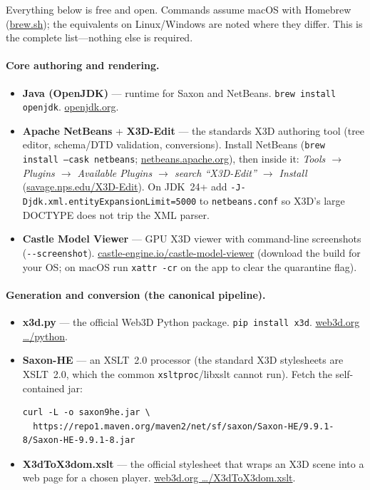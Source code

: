 \documentclass[11pt]{article}
\begin{document}
Everything below is free and open. Commands assume macOS with Homebrew
(\href{https://brew.sh}{brew.sh}); the equivalents on Linux/Windows are
noted where they differ. This is the complete list---nothing else is required.

\paragraph{Core authoring and rendering.}
\begin{itemize}[leftmargin=1.4em, itemsep=2pt]
\item \textbf{Java (OpenJDK)} --- runtime for Saxon and NetBeans.
  \texttt{brew install openjdk}. \href{https://openjdk.org}{openjdk.org}.
\item \textbf{Apache NetBeans} + \textbf{X3D-Edit} --- the standards X3D authoring
  tool (tree editor, schema/DTD validation, conversions). Install NetBeans
  (\texttt{brew install --cask netbeans}; \href{https://netbeans.apache.org}{netbeans.apache.org}),
  then inside it: \emph{Tools $\to$ Plugins $\to$ Available Plugins $\to$ search
  ``X3D-Edit'' $\to$ Install}
  (\href{https://savage.nps.edu/X3D-Edit/}{savage.nps.edu/X3D-Edit}). On JDK~24+
  add \texttt{-J-Djdk.xml.entityExpansionLimit=5000} to \texttt{netbeans.conf}
  so X3D's large DOCTYPE does not trip the XML parser.
\item \textbf{Castle Model Viewer} --- GPU X3D viewer with command-line
  screenshots (\texttt{-{}-screenshot}).
  \href{https://castle-engine.io/castle-model-viewer}{castle-engine.io/castle-model-viewer}
  (download the build for your OS; on macOS run \texttt{xattr -cr} on the app to
  clear the quarantine flag).
\end{itemize}

\paragraph{Generation and conversion (the canonical pipeline).}
\begin{itemize}[leftmargin=1.4em, itemsep=2pt]
\item \textbf{x3d.py} --- the official Web3D Python package.
  \texttt{pip install x3d}. \href{https://www.web3d.org/x3d/stylesheets/python/python.html}{web3d.org \dots/python}.
\item \textbf{Saxon-HE} --- an XSLT~2.0 processor (the standard X3D stylesheets
  are XSLT~2.0, which the common \texttt{xsltproc}/libxslt cannot run). Fetch the
  self-contained jar:
\begin{lstlisting}
curl -L -o saxon9he.jar \
  https://repo1.maven.org/maven2/net/sf/saxon/Saxon-HE/9.9.1-8/Saxon-HE-9.9.1-8.jar
\end{lstlisting}
\item \textbf{X3dToX3dom.xslt} --- the official stylesheet that wraps an X3D scene
  into a web page for a chosen player.
  \href{https://www.web3d.org/x3d/stylesheets/X3dToX3dom.xslt}{web3d.org \dots/X3dToX3dom.xslt}.
\end{itemize}
\end{document}
